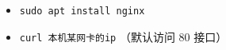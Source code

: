 
\begin{issues}
\issueDraft
\end{issues}

\begin{itemize}
\item \verb|sudo apt install nginx|
\item \verb|curl 本机某网卡的ip| （默认访问 80 接口）
\end{itemize}
